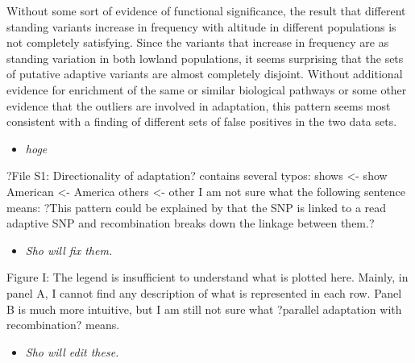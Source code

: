 \documentclass[onecolumn,oneside,letterpaper]{article}
\begin{document}
Without some sort of evidence of functional significance, the result that different standing variants increase in frequency with altitude in different populations is not completely satisfying.  Since the variants that increase in frequency are as standing variation in both lowland populations, it seems surprising that the sets of putative adaptive variants are almost completely disjoint.  Without additional evidence for enrichment of the same or similar biological pathways or some other evidence that the outliers are involved in adaptation, this pattern seems most consistent with a finding of different sets of false positives in the two data sets.  
\setlength{\parskip}{-5.0pt}
\begin{itemize}
\item \textit{ hoge }
\end{itemize}
\setlength{\parskip}{10.0pt}

?File S1: Directionality of adaptation? contains several typos: 
shows <- show 
American <- America 
others <- other 
I am not sure what the following sentence means: ?This pattern could be explained by that the SNP is linked to a read adaptive SNP and recombination breaks down the linkage between them.?   
\setlength{\parskip}{-5.0pt}
\begin{itemize}
\item \textit{ Sho will fix them. }
\end{itemize}
\setlength{\parskip}{10.0pt}

Figure I: The legend is insufficient to understand what is plotted here. Mainly, in panel A, I cannot find any description of what is represented in each row. Panel B is much more intuitive, but I am still not sure what ?parallel adaptation with recombination? means.  
\setlength{\parskip}{-5.0pt}
\begin{itemize}
\item \textit{ Sho will edit these. }
\end{itemize}
\setlength{\parskip}{10.0pt}

\end{document}
